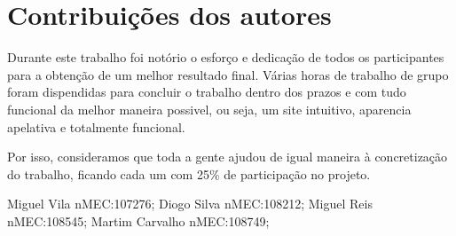\documentclass{report}
\begin{document}
\chapter{Contribuições dos autores}
Durante este trabalho foi notório o esforço e dedicação de todos os participantes para a obtenção de um melhor resultado final. Várias horas de trabalho de grupo foram dispendidas para concluir o trabalho dentro dos prazos e com tudo funcional da melhor maneira possivel, ou seja, um site intuitivo, aparencia apelativa e totalmente funcional.

Por isso, consideramos que toda a gente ajudou de igual maneira à concretização do trabalho, ficando cada um com 25\% de participação no projeto.

Miguel Vila nMEC:107276; Diogo Silva nMEC:108212; Miguel Reis nMEC:108545; Martim Carvalho nMEC:108749;
\end{document}

